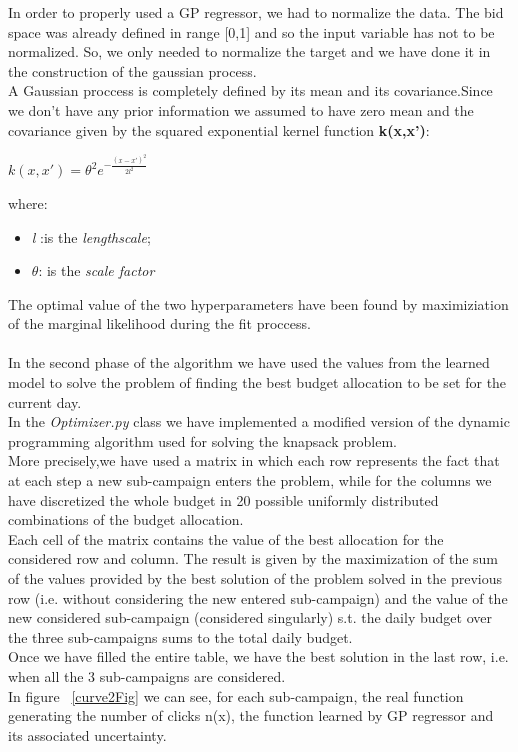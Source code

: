 In order to properly used a GP regressor, we had to normalize the data. The bid space was already defined in range [0,1] and so the input variable has not to be normalized. So, we only needed to normalize the target and we have done it in the construction of the gaussian process.\\
A Gaussian proccess is completely defined by its mean and its covariance.Since we don't have any prior information we assumed to have zero mean and the covariance given by the squared exponential kernel function \textbf{k(x,x')}:
\begin{center}
	$k(x,x') = \theta^{2} e^{-\frac{(x-x')^2}{2 l^2}}$
\end{center}
where:
\begin{itemize}
	\item \textit{l} :is the \textit{lengthscale};
	\item $\theta$: is the \textit{scale factor}
\end{itemize}
The optimal value of the two hyperparameters have been found by maximiziation of the marginal likelihood during the fit proccess.
\\
\\
In the second phase of the algorithm we have used the values from the learned model to solve the problem of finding the best budget allocation to be set for the current day.\\
In the \textit{Optimizer.py} class we have implemented a modified version of the dynamic programming algorithm used for solving the knapsack problem.\\
More precisely,we have used a matrix in which each row represents the fact that at each step a new sub-campaign enters the problem, while for the columns we have discretized the whole budget in 20 possible uniformly distributed combinations of the budget allocation.\\
Each cell of the matrix contains the value of the best allocation for the considered row and column. 
The result is given by the maximization of the sum of the values provided by the best solution of the problem solved in the previous row (i.e. without considering the new entered sub-campaign) and 
the value of the new considered sub-campaign (considered singularly) s.t. the daily budget over the three sub-campaigns sums to the total daily budget.\\
Once we have filled the entire table, we have the best solution in the last row, i.e. when all the 3 sub-campaigns are considered.\\
In figure ~\ref{curve2Fig} we can see, for each sub-campaign, the real function generating the number of clicks n(x), the function learned by GP regressor and its associated uncertainty.

